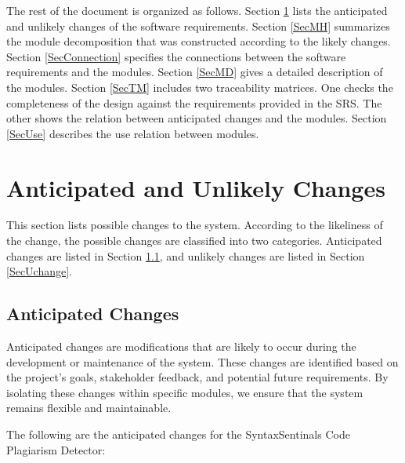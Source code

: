 \documentclass[12pt, titlepage]{article}
\begin{document}
The rest of the document is organized as follows. Section
\ref{SecChange} lists the anticipated and unlikely changes of the software
requirements. Section \ref{SecMH} summarizes the module decomposition that
was constructed according to the likely changes. Section \ref{SecConnection}
specifies the connections between the software requirements and the
modules. Section \ref{SecMD} gives a detailed description of the
modules. Section \ref{SecTM} includes two traceability matrices. One checks
the completeness of the design against the requirements provided in the SRS. The
other shows the relation between anticipated changes and the modules. Section
\ref{SecUse} describes the use relation between modules.

\section{Anticipated and Unlikely Changes} \label{SecChange}

This section lists possible changes to the system. According to the likeliness
of the change, the possible changes are classified into two
categories. Anticipated changes are listed in Section \ref{SecAchange}, and
unlikely changes are listed in Section \ref{SecUchange}.

\subsection{Anticipated Changes} \label{SecAchange}


Anticipated changes are modifications that are likely to occur during the development or maintenance of the system. 
These changes are identified based on the project's goals, stakeholder feedback, and potential future requirements. 
By isolating these changes within specific modules, we ensure that the system remains flexible and maintainable.

The following are the anticipated changes for the SyntaxSentinals Code Plagiarism Detector:
\end{document}

